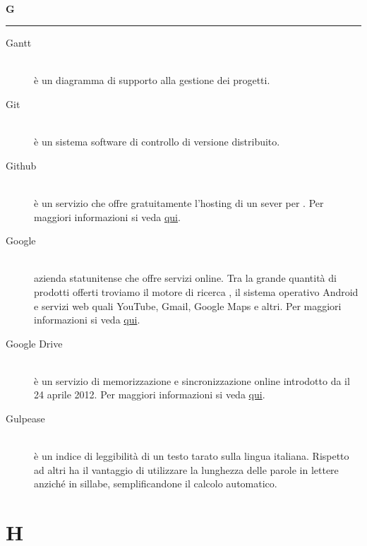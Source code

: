 \documentclass[12pt,a4paper]{article}
\begin{document}
\newpage

\begin{center}
\hfill\\
	\LARGE \textbf{G}
\hfill\\
\rule[15pt]{30pt}{0.5pt}
\end{center}

\begin{description}
\item[Gantt] 
\hfill\\ è un diagramma di supporto alla gestione dei progetti.

\item[Git] 
\hfill\\ è un sistema software di controllo di versione distribuito.

\item[Github] 
\hfill\\ è un servizio che offre gratuitamente l'hosting di un sever per . Per maggiori informazioni si veda \href{https://github.com}{qui}.

\item[Google] 
\hfill\\ azienda statunitense che offre servizi online. Tra la grande quantità di prodotti offerti troviamo il motore di ricerca , il sistema operativo Android e servizi web quali YouTube, Gmail, Google Maps e altri. Per maggiori informazioni si veda \href{https://it.wikipedia.org/wiki/Google_Inc.}{qui}.

\item[Google Drive] 
\hfill\\ è un servizio di memorizzazione e sincronizzazione online introdotto da  il 24 aprile 2012. Per maggiori informazioni si veda \href{https://it.wikipedia.org/wiki/Google_Drive}{qui}.

\item[Gulpease] 
\hfill\\ è un indice di leggibilità di un testo tarato sulla lingua italiana. Rispetto ad altri ha il vantaggio di utilizzare la lunghezza delle parole in lettere anziché in sillabe, semplificandone il calcolo automatico.
\end{description}

\newpage

\section{H}
\end{document}
